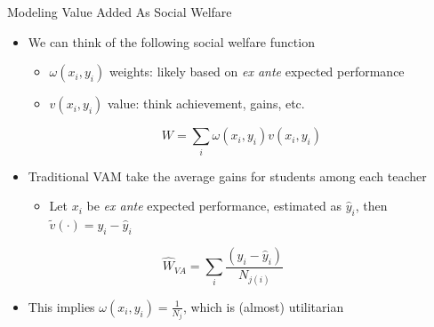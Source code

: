 \documentclass[11pt]{beamer}
\begin{document}
\begin{frame}{Modeling Value Added As Social Welfare}

\begin{itemize}
    \item We can think of the following social welfare function
    \begin{itemize}
        \item $\omega(x_i,y_i)$ weights: likely based on \textit{ex ante} expected performance
        \item $v(x_i,y_i)$ value: think achievement, gains, etc.
    \end{itemize}
    \[
    W  = \sum_i \omega(x_i,y_i) v(x_i,y_i) 
    \] 
    
    \item Traditional VAM take the average gains for students among each teacher
    \begin{itemize}
        \item Let $x_i$ be \textit{ex ante} expected performance, estimated as $\hat{y}_i$, then $\tilde{v}(\cdot) = y_i - \hat{y}_i$
    \end{itemize}
    \[
    \hat{W}_{VA}  = \sum_i \frac{(y_i-\hat{y}_i)}{N_{j(i)}} \hspace{3em}
    \]
    
    \item This implies $\omega(x_i,y_i)=\frac{1}{N_j}$, which is (almost) utilitarian

\end{itemize}


\end{frame}


\end{document}
